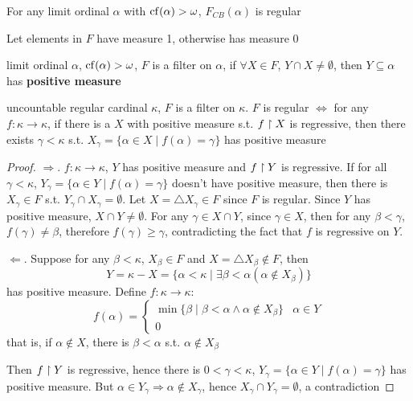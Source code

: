 \documentclass[11pt]{article}
\def \btu {\bigtriangleup}
\begin{document}
\begin{examplle}[]
For any limit ordinal \(\alpha\) with \(\operatorname{cf}(\alpha)>\omega\), \(F_{CB}(\alpha)\) is regular
\end{examplle}

Let elements in \(F\) have measure 1, otherwise has measure 0
\begin{definition}[]
limit ordinal \(\alpha\), \(\operatorname{cf}(\alpha)>\omega\), \(F\) is a filter on \(\alpha\), if \(\forall X\in F\), \(Y\cap X\neq\emptyset\), then \(Y\subseteq\alpha\)
has \textbf{positive measure}
\end{definition}

\begin{lemma}[]
uncountable regular cardinal \(\kappa\), \(F\) is a filter on \(\kappa\). \(F\) is regular \(\Leftrightarrow\) for
any \(f:\kappa\to\kappa\), if there is a \(X\) with positive measure s.t. \(f\upharpoonright X\) is regressive, then
there exists \(\gamma<\kappa\) s.t. \(X_\gamma=\{\alpha\in X\mid f(\alpha)=\gamma\}\) has positive measure
\end{lemma}

\begin{proof}
\(\Rightarrow\). \(f:\kappa\to\kappa\), \(Y\) has positive measure and \(f\upharpoonright Y\) is regressive. If for
all \(\gamma<\kappa\), \(Y_\gamma=\{\alpha\in Y\mid f(\alpha)=\gamma\}\) doesn't have positive measure, then there is \(X_\gamma\in F\)
s.t. \(Y_\gamma\cap X_\gamma=\emptyset\). Let \(X=\btu X_\gamma\in F\) since \(F\) is regular. Since \(Y\) has positive
measure, \(X\cap Y\neq\emptyset\). For any \(\gamma\in X\cap Y\), since \(\gamma\in X\), then for any \(\beta<\gamma\), \(f(\gamma)\neq\beta\),
therefore \(f(\gamma)\ge\gamma\), contradicting the fact that \(f\) is regressive on \(Y\).

\(\Leftarrow\). Suppose for any \(\beta<\kappa\), \(X_\beta\in F\) and \(X=\btu X_\beta\notin F\), then
\begin{equation*}
Y=\kappa-X=\{\alpha<\kappa\mid\exists\beta<\alpha(\alpha\notin X_\beta)\}
\end{equation*}
has positive measure. Define \(f:\kappa\to\kappa\):
\begin{equation*}
f(\alpha)=
\begin{cases}
\min\{\beta\mid\beta<\alpha\wedge\alpha\notin X_\beta\}&\alpha\in Y\\
0
\end{cases}
\end{equation*}
that is, if \(\alpha\notin X\), there is \(\beta<\alpha\) s.t. \(\alpha\notin X_\beta\)

Then \(f\upharpoonright Y\) is regressive, hence there is \(0<\gamma<\kappa\), \(Y_\gamma=\{\alpha\in Y\mid f(\alpha)=\gamma\}\) has positive
measure. But \(\alpha\in Y_\gamma\Rightarrow\alpha\notin X_\gamma\), hence \(X_\gamma\cap Y_\gamma=\emptyset\), a contradiction
\end{proof}
\end{document}
